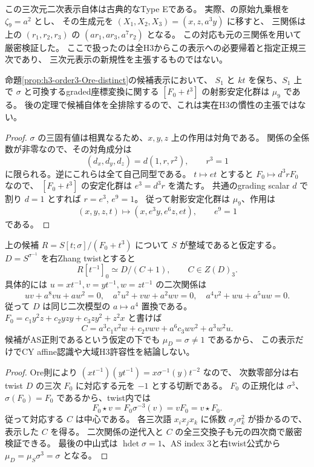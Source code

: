 この三次元二次表示自体は古典的なType Eである。
実際、\cite[p.~186]{LBS}の原始九乗根を $\zeta_9=a^2$ とし、
その生成元を $(X_1,X_2,X_3)=(x,z,a^3y)$ に移すと、
三関係は上の $(r_1,r_2,r_3)$ の $(ar_1,ar_3,a^7r_2)$ となる。
この対応も元の三関係を用いて厳密検証した。
ここで扱ったのは全H3からこの表示への必要帰着と指定正規三次であり、
三次元表示の新規性を主張するものではない。

\begin{corollary}[排除候補の射影安定化群]
\label{cor:h3-order3-candidate-inertia}
命題\ref{prop:h3-order3-Ore-distinct}の候補表示において、
$S_1$ と $kt$ を保ち、$S_1$ 上で $\sigma$ と可換するgraded座標変換に関する
$[F_0+t^3]$ の射影安定化群は $\mu_9$ である。
後の定理で候補自体を全排除するので、これは実在H3の慣性の主張ではない。
\end{corollary}
\begin{proof}
$\sigma$ の三固有値は相異なるため、$x,y,z$ 上の作用は対角である。
関係の全係数が非零なので、その対角成分は
\[
 (d_x,d_y,d_z)=d(1,r,r^2),\qquad r^3=1
\]
に限られる。逆にこれらは全て自己同型である。
$t\mapsto et$ とすると $F_0\mapsto d^3rF_0$ なので、
$[F_0+t^3]$ の安定化群は $e^3=d^3r$ を満たす。
共通のgrading scalar $d$ で割り $d=1$ とすれば $r=e^3$, $e^9=1$。
従って射影安定化群は $\mu_9$、作用は
\[
 (x,y,z,t)\longmapsto(x,e^3y,e^6z,et),\qquad e^9=1
\]
である。
\end{proof}

\begin{lemma}[有限候補の正規Ore開集合]
\label{lem:h3-order3-candidate-affine}
上の候補 $R=S[t;\sigma]/(F_0+t^3)$ について $S$ が整域であると仮定する。
$D=S^{\sigma^{-1}}$ を右Zhang twistとすると
\[
 R[t^{-1}]_0\simeq D/(C+1),\qquad C\in Z(D)_3.
\]
具体的には $u=xt^{-1},v=yt^{-1},w=zt^{-1}$ の二次関係は
\[
 uv+a^8vu+aw^2=0,\quad
 a^7u^2+vw+a^2wv=0,\quad
 a^4v^2+wu+a^5uw=0.
\]
従って $D$ は同じ二次模型の $a\mapsto a^4$ 置換である。
$F_0=c_1y^2z+c_2yzy+c_3zy^2+z^2x$ と書けば
\[
 C=a^3c_1v^2w+c_2vwv+a^6c_3wv^2+a^3w^2u.
\]
候補がAS正則であるという仮定の下でも $\mu_D=\sigma\ne1$ であるから、
この表示だけでCY affine認識や大域H3許容性を結論しない。
\end{lemma}
\begin{proof}
Ore則により $(xt^{-1})(yt^{-1})=x\sigma^{-1}(y)t^{-2}$ なので、
次数零部分は右twist $D$ の三次 $F_0$ に対応する元を $-1$ とする切断である。
$F_0$ の正規化は $\sigma^3$、$\sigma(F_0)=F_0$ であるから、twist内では
\[
 F_0\star v=F_0\sigma^{-3}(v)=vF_0=v\star F_0.
\]
従って対応する $C$ は中心である。
各三次語 $x_ix_jx_k$ に係数 $\sigma_j\sigma_k^2$ が掛かるので、表示した $C$ を得る。
二次関係の逆代入と $C$ の全三交換子も元の四次商で厳密検証できる。
最後の中山式は $\operatorname{hdet}\sigma=1$、AS index 3と右twist公式から
$\mu_D=\mu_S\sigma^3=\sigma$ となる。
\end{proof}

